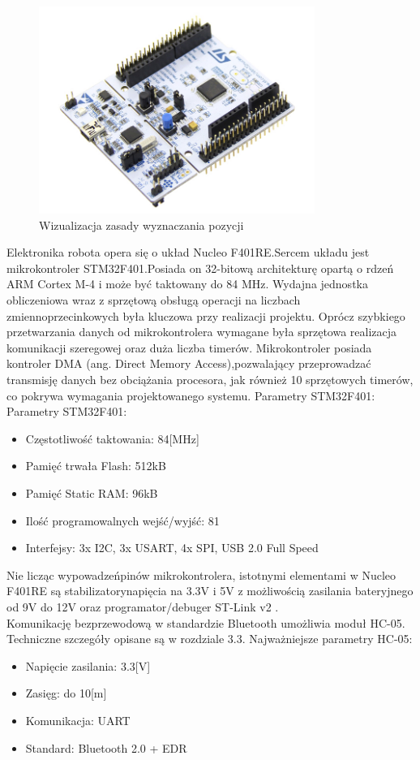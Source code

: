 \documentclass[eng,printmode]{mgr}
\begin{document}
  \begin{figure}[ht]
   \centering
   \includegraphics[width=9cm]{images/nucleo}
   \caption{Wizualizacja zasady wyznaczania pozycji}
   \label{fig:nucleo}
  \end{figure} 

Elektronika robota opera się o układ Nucleo F401RE.Sercem układu jest mikrokontroler STM32F401.Posiada on 32-bitową architekturę opartą o rdzeń ARM Cortex M-4 i może być taktowany do 84 MHz. Wydajna jednostka obliczeniowa wraz z sprzętową obsługą operacji na liczbach zmiennoprzecinkowych była kluczowa przy realizacji projektu.  Oprócz szybkiego przetwarzania danych od mikrokontrolera wymagane była sprzętowa realizacja komunikacji szeregowej oraz duża liczba timerów.  Mikrokontroler posiada kontroler DMA (ang. Direct Memory Access),pozwalający przeprowadzać transmisję danych bez obciążania procesora, jak również 10 sprzętowych timerów, co pokrywa wymagania projektowanego systemu.
Parametry STM32F401:
\newline Parametry STM32F401:
\begin{itemize}
  \item Częstotliwość taktowania: 84[MHz]
  \item Pamięć trwała Flash: 512kB
  \item Pamięć Static RAM: 96kB
  \item Ilość programowalnych wejść/wyjść: 81
  \item Interfejsy: 3x I2C, 3x USART, 4x SPI, USB 2.0 Full Speed
\end{itemize}

Nie licząc wypowadzeńpinów mikrokontrolera, istotnymi elementami w Nucleo F401RE są stabilizatorynapięcia na 3.3V i 5V z możliwością zasilania bateryjnego od 9V do 12V oraz programator/debuger ST-Link v2 . 
\\Komunikację bezprzewodową w standardzie Bluetooth umożliwia moduł HC-05. Techniczne szczegóły opisane są w rozdziale 3.3. Najważniejsze parametry HC-05:
\begin{itemize}
  \item Napięcie zasilania: 3.3[V]
  \item Zasięg: do 10[m]
  \item Komunikacja: UART
  \item Standard: Bluetooth 2.0 + EDR
\end{itemize}
\end{document}
